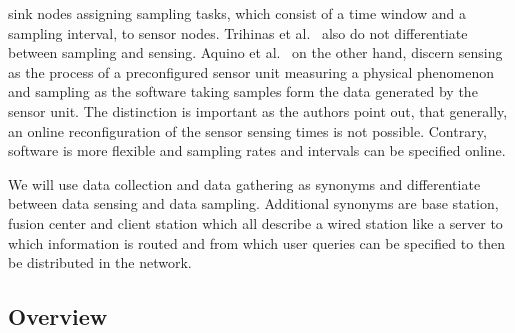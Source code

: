 sink nodes assigning sampling tasks, which consist of a time window and a
sampling interval, to sensor nodes. Trihinas et al.~\cite{trihinas2015adam}
also do not differentiate between sampling and sensing. Aquino et
al.~\cite{aquino2014musa} on the other hand, discern sensing as the process of
a preconfigured sensor unit measuring a physical phenomenon and sampling as the
software taking samples form the data generated by the sensor unit. The
distinction is important as the authors point out, that generally, an online
reconfiguration of the sensor sensing times is not possible. Contrary, software
is more flexible and sampling rates and intervals can be specified online.
\par
We will use data collection and data gathering as synonyms and differentiate
between data sensing and data sampling. Additional synonyms are base station,
fusion center and client station which all describe a wired station like a
server to which information is routed and from which user queries can be
specified to then be distributed in the network.

\subsection{Overview}
\label{sec:Overview}


\subsection{\catI} %
\label{sec:\catI}

